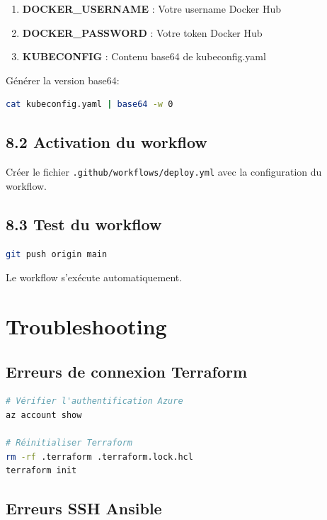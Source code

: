 \documentclass[12pt,a4paper,twoside]{report}
\begin{document}
\begin{enumerate}
    \item \textbf{DOCKER\_USERNAME} : Votre username Docker Hub
    \item \textbf{DOCKER\_PASSWORD} : Votre token Docker Hub
    \item \textbf{KUBECONFIG} : Contenu base64 de kubeconfig.yaml
\end{enumerate}

Générer la version base64:

\begin{lstlisting}[language=bash]
cat kubeconfig.yaml | base64 -w 0
\end{lstlisting}

\subsection{8.2 Activation du workflow}

Créer le fichier \texttt{.github/workflows/deploy.yml} avec la configuration du workflow.

\subsection{8.3 Test du workflow}

\begin{lstlisting}[language=bash]
git push origin main
\end{lstlisting}

Le workflow s'exécute automatiquement.

\section{Troubleshooting}

\subsection{Erreurs de connexion Terraform}

\begin{lstlisting}[language=bash]
# Vérifier l'authentification Azure
az account show

# Réinitialiser Terraform
rm -rf .terraform .terraform.lock.hcl
terraform init
\end{lstlisting}

\subsection{Erreurs SSH Ansible}
\end{document}
